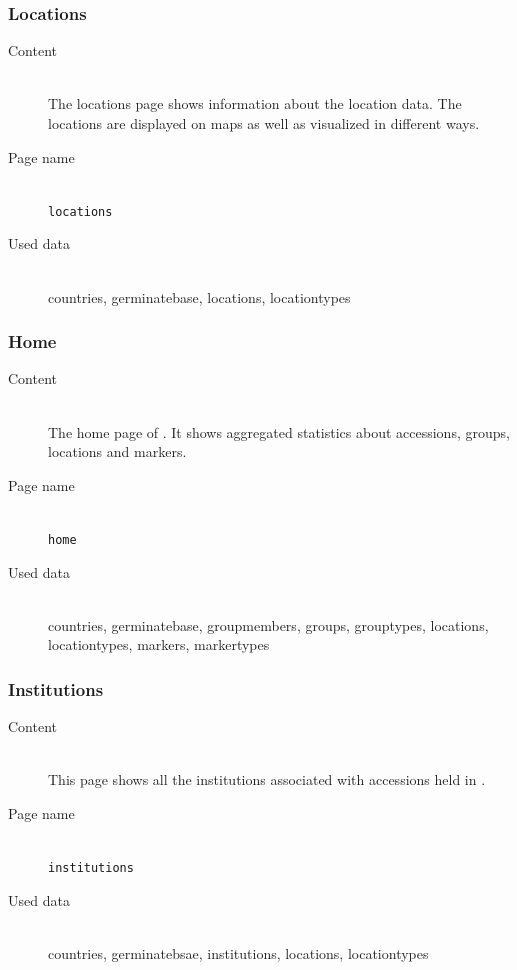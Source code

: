 \subsubsection{Locations}
\begin{description}
	\item[Content]\hfill\\The locations page shows information about the location data. The locations are displayed on maps as well as visualized in different ways.
	\item[Page name]\hfill\\\texttt{locations}
	\item[Used data]\hfill\\countries, germinatebase, locations, locationtypes
\end{description}

\subsubsection{Home}
\begin{description}
	\item[Content]\hfill\\The home page of {\germinate}. It shows aggregated statistics about accessions, groups, locations and markers.
	\item[Page name]\hfill\\\texttt{home}
	\item[Used data]\hfill\\countries, germinatebase, groupmembers, groups, grouptypes, locations, locationtypes, markers, markertypes
\end{description}

\subsubsection{Institutions}
\begin{description}
	\item[Content]\hfill\\This page shows all the institutions associated with accessions held in {\germinate}.
	\item[Page name]\hfill\\\texttt{institutions}
	\item[Used data]\hfill\\countries, germinatebsae, institutions, locations, locationtypes
\end{description}

